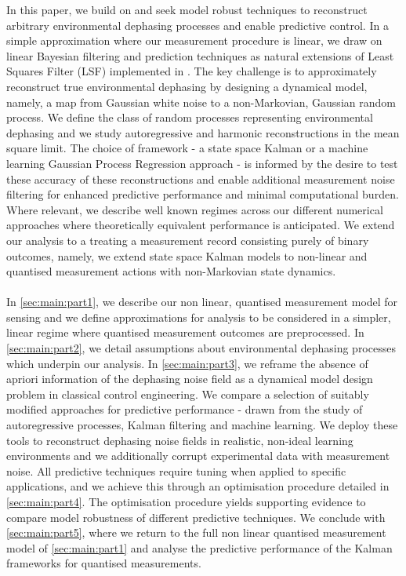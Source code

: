 In this paper, we build on \cite{mavadia2017} and seek model robust techniques to reconstruct arbitrary environmental dephasing processes and enable predictive control. In a simple approximation where our measurement procedure is linear, we draw on linear Bayesian filtering and prediction techniques as natural extensions of Least Squares Filter (LSF) implemented in \cite{mavadia2017}. The key challenge is to approximately reconstruct true environmental dephasing by designing a dynamical model, namely, a map from Gaussian white noise to a non-Markovian, Gaussian random process. We define the class of random processes representing environmental dephasing and we study autoregressive and harmonic reconstructions in the mean square limit. The choice of framework - a state space Kalman or a machine learning Gaussian Process Regression approach - is informed by the desire to test these accuracy of these reconstructions and enable additional measurement noise filtering for enhanced predictive performance and minimal computational burden. Where relevant, we describe well known regimes across our different numerical approaches where theoretically equivalent performance is anticipated. We extend our analysis to a treating a measurement record consisting purely of binary outcomes, namely, we extend state space Kalman models to non-linear and quantised measurement actions with non-Markovian state dynamics. 
\\
\\
In \cref{sec:main:part1}, we describe our non linear, quantised measurement model for sensing and we define approximations for analysis to be considered in a simpler, linear regime where quantised measurement outcomes are preprocessed. In \cref{sec:main:part2}, we detail assumptions about environmental dephasing processes which underpin our analysis. In \cref{sec:main:part3}, we reframe the absence of apriori information of the dephasing noise field as a dynamical model design problem in classical control engineering. We compare a selection of suitably modified approaches for predictive performance - drawn from the study of autoregressive processes, Kalman filtering and machine learning. We deploy these tools to reconstruct dephasing noise fields in realistic, non-ideal learning environments and we additionally corrupt experimental data with measurement noise. All predictive techniques require tuning when applied to specific applications, and we achieve this through an optimisation procedure detailed in \cref{sec:main:part4}. The optimisation procedure yields supporting evidence to compare model robustness of different predictive techniques. We conclude with \cref{sec:main:part5}, where we return to the full non linear quantised measurement model of \cref{sec:main:part1} and analyse the predictive performance of the Kalman frameworks for quantised measurements. 
